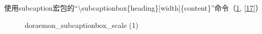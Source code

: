 \documentclass{article}
\begin{document}
    使用subcaption宏包的``\textbackslash subcaptionbox\{heading\}[width]\{content\}''命令（\ref{16}, \ref{17}）

    \begin{figure}[htbp]
        \hfill
        \hfill
        \caption{doraemon\_subcaptionbox\_scale (1)}
        \label{16}
    \end{figure}
\end{document}
